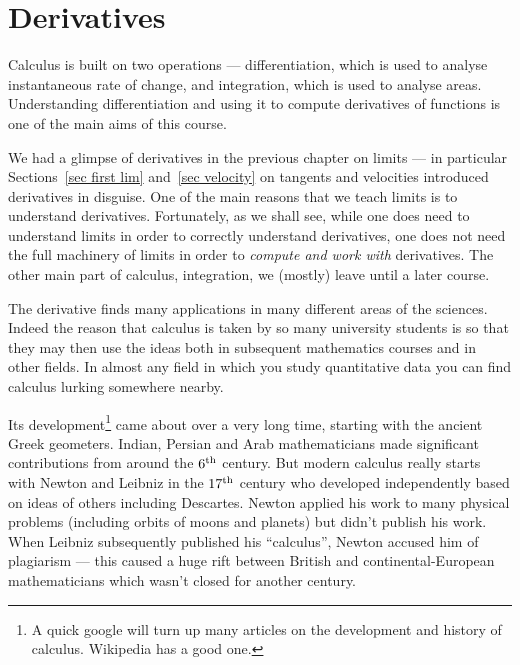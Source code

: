 %
%

\def\lin{{\text{LIN}}}
\def\prod{{\text{PR}}}
\def\quot{{\text{QR}}}
\def\simp{{\text{SMP}}}

\graphicspath{{figures/differentiation/}}
\chapter{Derivatives}\label{chap deriv}

Calculus is built on two operations --- differentiation, which is used to analyse
instantaneous rate of change, and integration, which is used to analyse areas.
Understanding differentiation and using it to compute derivatives of functions is one of the
main aims of this course.

We had a glimpse of derivatives in the previous chapter on limits --- in particular
Sections~\ref{sec first lim} and~\ref{sec velocity} on tangents and velocities introduced
derivatives in disguise. One of the main reasons that we teach limits is to understand
derivatives. Fortunately, as we shall see, while one does need to understand limits in
order to correctly understand derivatives, one does not need the full machinery of limits
in order to \emph{compute and work with} derivatives. The other main part of calculus,
integration, we (mostly) leave until a later course.

The derivative finds many applications in many different areas of the sciences. Indeed
the
reason that calculus is taken by so many university students is so that they may then use
the ideas both in subsequent mathematics courses and in other fields. In almost any field
in which you study quantitative data you can find calculus lurking somewhere nearby.

Its development\footnote{A quick google will turn up many articles on the development and
history of calculus. Wikipedia has a good one.} came about over a very long time,
starting
with the ancient Greek geometers. Indian, Persian and Arab mathematicians made
significant
contributions from around the $6^{\rm th}$ century. But modern calculus really starts
with
Newton and Leibniz in the $17^{\rm th}$ century who developed independently based on
ideas
of others including Descartes. Newton applied his work to many physical problems
(including orbits of moons and planets) but didn't publish his work. When Leibniz
subsequently published his ``calculus'', Newton accused him of plagiarism --- this caused
a huge rift between British and  continental-European mathematicians which wasn't closed
for another century.



